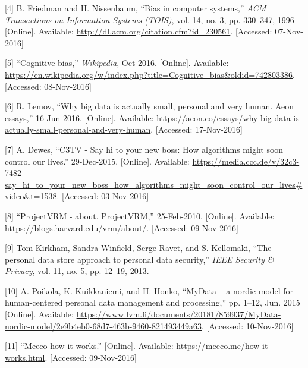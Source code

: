 \documentclass[12pt,english,a4paper,titlepage,cleardoublepage=empty,dottedtoc]{report}
\begin{document}
\hypertarget{ref-paper_1996_bias-in-computer-systems}{}
{[}4{]} B. Friedman and H. Nissenbaum, ``Bias in computer systems,''
\emph{ACM Transactions on Information Systems (TOIS)}, vol. 14, no. 3,
pp. 330--347, 1996 {[}Online{]}. Available:
\url{http://dl.acm.org/citation.cfm?id=230561}. {[}Accessed:
07-Nov-2016{]}

\hypertarget{ref-wikipedia_2016_cognitive-bias}{}
{[}5{]} ``Cognitive bias,'' \emph{Wikipedia}, Oct-2016. {[}Online{]}.
Available:
\url{https://en.wikipedia.org/w/index.php?title=Cognitive_bias\&oldid=742803386}.
{[}Accessed: 08-Nov-2016{]}

\hypertarget{ref-web_2016_big-data-is-people}{}
{[}6{]} R. Lemov, ``Why big data is actually small, personal and very
human. Aeon essays,'' 16-Jun-2016. {[}Online{]}. Available:
\url{https://aeon.co/essays/why-big-data-is-actually-small-personal-and-very-human}.
{[}Accessed: 17-Nov-2016{]}

\hypertarget{ref-video_2015_big-data-and-deep-learning_discrimination}{}
{[}7{]} A. Dewes, ``C3TV - Say hi to your new boss: How algorithms might
soon control our lives.'' 29-Dec-2015. {[}Online{]}. Available:
\url{https://media.ccc.de/v/32c3-7482-say_hi_to_your_new_boss_how_algorithms_might_soon_control_our_lives\#video\&t=1538}.
{[}Accessed: 03-Nov-2016{]}

\hypertarget{ref-web_2010_projectvrm_about}{}
{[}8{]} ``ProjectVRM - about. ProjectVRM,'' 25-Feb-2010. {[}Online{]}.
Available: \url{https://blogs.harvard.edu/vrm/about/}. {[}Accessed:
09-Nov-2016{]}

\hypertarget{ref-paper_2013_the-personal-data-store-approach-to-personal-data-security_2013}{}
{[}9{]} Tom Kirkham, Sandra Winfield, Serge Ravet, and S. Kellomaki,
``The personal data store approach to personal data security,''
\emph{IEEE Security \& Privacy}, vol. 11, no. 5, pp. 12--19, 2013.

\hypertarget{ref-whitepaper_2014_mydata-a-nordic-model-for-human-centered-personal-data-management-and-processing}{}
{[}10{]} A. Poikola, K. Kuikkaniemi, and H. Honko, ``MyData -- a nordic
model for human-centered personal data management and processing,'' pp.
1--12, Jun. 2015 {[}Online{]}. Available:
\url{https://www.lvm.fi/documents/20181/859937/MyData-nordic-model/2e9b4eb0-68d7-463b-9460-821493449a63}.
{[}Accessed: 10-Nov-2016{]}

\hypertarget{ref-web_2016_meeco-how-it-works}{}
{[}11{]} ``Meeco how it works.'' {[}Online{]}. Available:
\url{https://meeco.me/how-it-works.html}. {[}Accessed: 09-Nov-2016{]}
\end{document}
